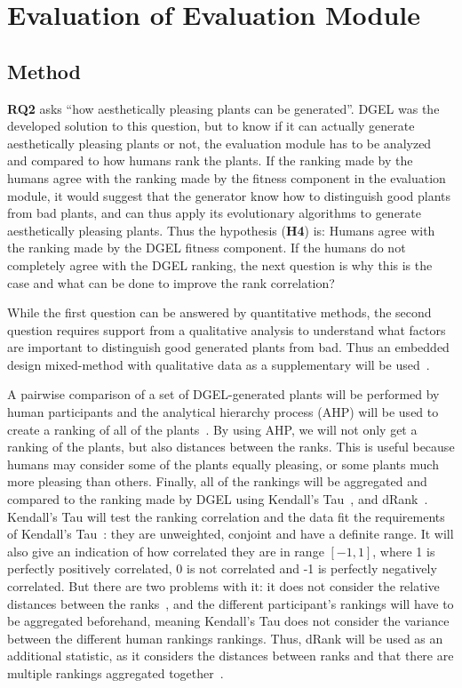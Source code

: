 \section{Evaluation of Evaluation Module}
\subsection{Method}
\textbf{RQ2} asks ``how aesthetically pleasing plants can be generated''.
DGEL was the developed solution to this question, but to know if it can actually generate aesthetically pleasing plants or not, the evaluation module has to be analyzed and compared to how humans rank the plants.
If the ranking made by the humans agree with the ranking made by the fitness component in the evaluation module, it would suggest that the generator know how to distinguish good plants from bad plants, and can thus apply its evolutionary algorithms to generate aesthetically pleasing plants.
Thus the hypothesis (\textbf{H4}) is: Humans agree with the ranking made by the DGEL fitness component.
If the humans do not completely agree with the DGEL ranking, the next question is why this is the case and what can be done to improve the rank correlation?

While the first question can be answered by quantitative methods, the second question requires support from a qualitative analysis to understand what factors are important to distinguish good generated plants from bad.
Thus an embedded design mixed-method with qualitative data as a supplementary will be used~\cite{PracticalResearch}.

A pairwise comparison of a set of DGEL-generated plants will be performed by human participants and the analytical hierarchy process (AHP) will be used to create a ranking of all of the plants~\cite{2008Saaty}.
By using AHP, we will not only get a ranking of the plants, but also distances between the ranks.
This is useful because humans may consider some of the plants equally pleasing, or some plants much more pleasing than others.
Finally, all of the rankings will be aggregated and compared to the ranking made by DGEL using Kendall's Tau~\cite{1938Kendall}, and dRank~\cite{2009Carterette}.
Kendall's Tau will test the ranking correlation and the data fit the requirements of Kendall's Tau~\cite{2010Webber}: they are unweighted, conjoint and have a definite range.
It will also give an indication of how correlated they are in range $[-1, 1]$, where 1 is perfectly positively correlated, 0 is not correlated and -1 is perfectly negatively correlated.
But there are two problems with it: it does not consider the relative distances between the ranks~\cite{2010Webber}, and the different participant's rankings will have to be aggregated beforehand, meaning Kendall's Tau does not consider the variance between the different human rankings rankings.
Thus, dRank will be used as an additional statistic, as it considers the distances between ranks and that there are multiple rankings aggregated together~\cite{2010Webber,2009Carterette}.


